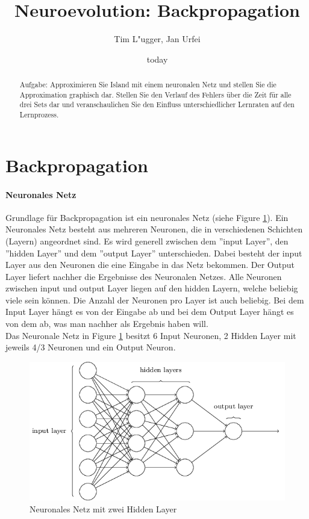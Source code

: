 \documentclass{hbrs-ecta-report}
\begin{document}

\title{Neuroevolution: Backpropagation}
\subtitle{}

\author{
\alignauthor
Tim L"ugger, Jan Urfei
}

\date{today}
\maketitle
\begin{abstract}
Aufgabe: Approximieren Sie Island mit einem neuronalen Netz und stellen Sie die Approximation graphisch dar. Stellen Sie den Verlauf des Fehlers über die Zeit für alle drei Sets dar und veranschaulichen Sie den Einfluss unterschiedlicher Lernraten auf den Lernprozess.
\end{abstract}

\section{Backpropagation}
\paragraph{Neuronales Netz}
Grundlage für Backpropagation ist ein neuronales Netz (siehe Figure \ref{fig:neuronalesNetz}). Ein Neuronales Netz besteht aus mehreren Neuronen, die in verschiedenen Schichten (Layern) angeordnet sind. Es wird generell zwischen dem ''input Layer'', den ''hidden Layer'' und dem ''output Layer'' unterschieden. Dabei besteht der input Layer aus den Neuronen die eine Eingabe in das Netz bekommen. Der Output Layer liefert nachher die Ergebnisse des Neuronalen Netzes. Alle Neuronen zwischen input und output Layer liegen auf den hidden Layern, welche beliebig viele sein können. Die Anzahl der Neuronen pro Layer ist auch beliebig. Bei dem Input Layer hängt es von der Eingabe ab und bei dem Output Layer hängt es von dem ab, was man nachher als Ergebnis haben will.\\
Das Neuronale Netz in Figure \ref{fig:neuronalesNetz} besitzt 6 Input Neuronen, 2 Hidden Layer mit jeweils 4/3 Neuronen und ein Output Neuron.
\begin{figure}[h!]
	\includegraphics[width=0.6\linewidth]{img/neuronalesNetz}
	\caption{Neuronales Netz mit zwei Hidden Layer}
	\label{fig:neuronalesNetz}
\end{figure}
\end{document}
